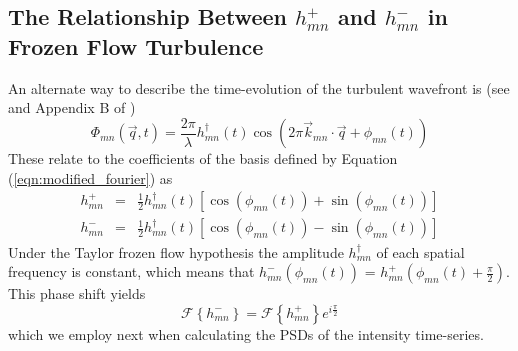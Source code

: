 \documentclass[11pt,preprint]{aastex}
\begin{document}
% 
% 
% 

\subsection{The Relationship Between $h_{mn}^+$ and $h_{mn}^-$ in Frozen Flow Turbulence}

An alternate way to describe the time-evolution of the turbulent wavefront is (see \citet{2005ApJ...629..592G} and Appendix B of \citet{2018JATIS...4a9001M})
\begin{equation}
\Phi_{mn}(\vec{q},t) = \frac{2\pi}{\lambda} h_{mn}^\dagger(t) \cos \left( 2\pi \vec{k}_{mn} \cdot \vec{q} + \phi_{mn}(t) \right)
\end{equation}
These relate to the coefficients of the basis defined by Equation (\ref{eqn:modified_fourier}) as
\begin{eqnarray}
h_{mn}^+ &=& \frac{1}{2} h_{mn}^\dagger(t) \left[ \cos(\phi_{mn}(t)) + \sin(\phi_{mn}(t))\right] \\
h_{mn}^- &=& \frac{1}{2} h_{mn}^\dagger(t) \left[ \cos(\phi_{mn}(t)) - \sin(\phi_{mn}(t))\right] \nonumber
\end{eqnarray}
Under the Taylor frozen flow hypothesis the amplitude $h_{mn}^\dagger$ of each spatial frequency is constant, which means that $h_{mn}^-(\phi_{mn}(t))$ = $h_{mn}^+(\phi_{mn}(t) + \frac{\pi}{2})$.  This phase shift yields
\begin{equation}
\mathcal{F}\left\{h_{mn}^-\right\} = \mathcal{F}\left\{h_{mn}^+\right\} e^{i\frac{\pi}{2}}
\end{equation}
which we employ next when calculating the PSDs of the intensity time-series.
\end{document}
